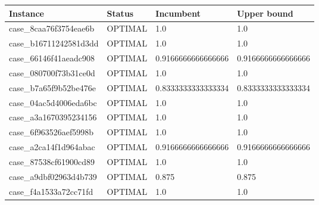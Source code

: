 \begin{tabular}{llll}
\toprule
Instance & Status & Incumbent & Upper bound\\
\midrule
case\_8caa76f3754eae6b & OPTIMAL & 1.0 & 1.0\\
case\_b16711242581d3dd & OPTIMAL & 1.0 & 1.0\\
case\_66146f41aeadc908 & OPTIMAL & 0.9166666666666666 & 0.9166666666666666\\
case\_080700f73b31ce0d & OPTIMAL & 1.0 & 1.0\\
case\_b7a65f9b52be476e & OPTIMAL & 0.8333333333333334 & 0.8333333333333334\\
case\_04ac5d4006eda6bc & OPTIMAL & 1.0 & 1.0\\
case\_a3a1670395234156 & OPTIMAL & 1.0 & 1.0\\
case\_6f963526aef5998b & OPTIMAL & 1.0 & 1.0\\
case\_a2ca14f1d964abac & OPTIMAL & 0.9166666666666666 & 0.9166666666666666\\
case\_87538cf61900cd89 & OPTIMAL & 1.0 & 1.0\\
case\_a9dbf02963d4b739 & OPTIMAL & 0.875 & 0.875\\
case\_f4a1533a72cc71fd & OPTIMAL & 1.0 & 1.0\\
\bottomrule
\end{tabular}